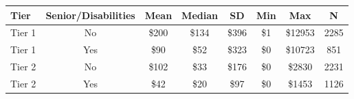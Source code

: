 \begin{tabular}{lccccccc}
\toprule 
\midrule 
Tier & Senior/Disabilities & Mean & Median & SD & Min & Max & N \\
\midrule 
Tier 1 & No & \$200 & \$134 & \$396 & \$1 & \$12953 & 2285 \\
Tier 1 & Yes & \$90 & \$52 & \$323 & \$0 & \$10723 & 851 \\
Tier 2 & No & \$102 & \$33 & \$176 & \$0 & \$2830 & 2231 \\
Tier 2 & Yes & \$42 & \$20 & \$97 & \$0 & \$1453 & 1126 \\
\midrule 
\bottomrule 
\end{tabular}
